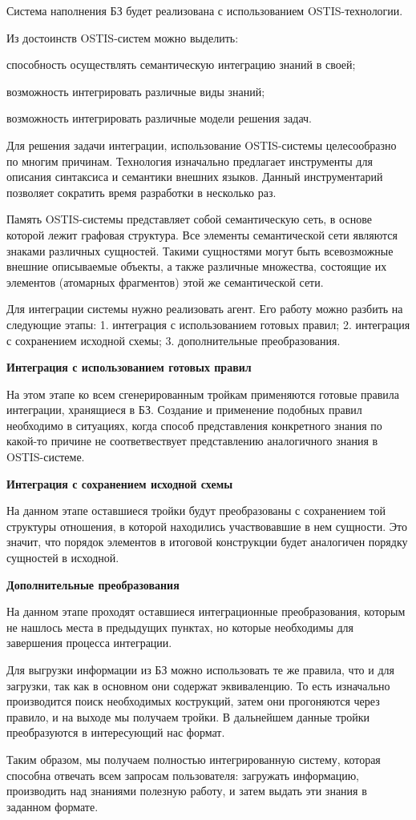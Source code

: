 Система наполнения БЗ будет реализована с использованием OSTIS-технологии.

Из достоинств OSTIS-систем можно выделить:
\begin{textitemize}
    \item способность осуществлять семантическую интеграцию знаний в своей;
    \item возможность интегрировать различные виды знаний;
    \item возможность интегрировать различные модели решения задач.
\end{textitemize}

Для решения задачи интеграции, использование OSTIS-системы целесообразно по многим причинам. Технология изначально предлагает инструменты для описания синтаксиса и семантики внешних языков. Данный инструментарий позволяет сократить время разработки в несколько раз.

Память OSTIS-системы представляет собой семантическую сеть, в основе которой лежит графовая структура. Все элементы семантической сети являются знаками различных сущностей. Такими сущностями могут быть всевозможные внешние описываемые объекты, а также различные множества, состоящие их элементов (атомарных фрагментов) этой же семантической сети.

Для интеграции системы нужно реализовать агент. Его работу можно разбить на следующие этапы:
1. интеграция с использованием готовых правил;
2. интеграция с сохранением исходной схемы;
3. дополнительные преобразования.

\textbf{Интеграция с использованием готовых правил}

На этом этапе ко всем сгенерированным тройкам применяются готовые правила интеграции, хранящиеся в БЗ. Создание и применение подобных правил необходимо в ситуациях, когда способ представления конкретного знания по какой-то причине не соответвествует представлению аналогичного знания в OSTIS-системе.

\textbf{Интеграция с сохранением исходной схемы}

На данном этапе оставшиеся тройки будут преобразованы с сохранением той структуры отношения, в которой находились участвовавшие в нем сущности. Это значит, что порядок элементов в итоговой конструкции будет аналогичен порядку сущностей в исходной.

\textbf{Дополнительные преобразования}

На данном этапе проходят оставшиеся интеграционные преобразования, которым не нашлось места в предыдущих пунктах, но которые необходимы для завершения процесса интеграции.

Для выгрузки информации из БЗ можно использовать те же правила, что и для загрузки, так как в основном они содержат эквиваленцию. То есть изначально производится поиск необходимых кострукций, затем они прогоняются через правило, и на выходе мы получаем тройки. В дальнейшем данные тройки преобразуются в интересующий нас формат.

Таким образом, мы получаем полностью интегрированную систему, которая способна отвечать всем запросам пользователя: загружать информацию, производить над знаниями полезную работу, и затем выдать эти знания в заданном формате.
